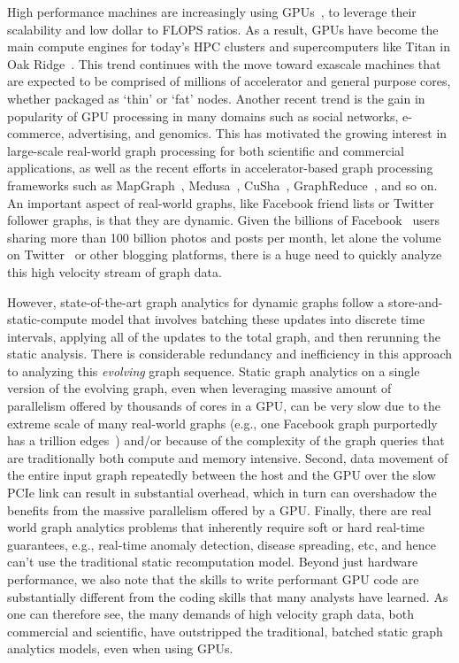 High performance machines are increasingly using GPUs~\cite{15, 16, 17, 18, 19}, to leverage their scalability and low dollar to FLOPS ratios.  As a result, GPUs have become the main compute engines for today’s HPC clusters and supercomputers like Titan in Oak Ridge~\cite{titan}. This trend continues with the move toward exascale machines that are expected to be comprised of millions of accelerator and general purpose cores, whether packaged as `thin' or `fat' nodes. Another recent trend is the gain in popularity of GPU processing in many domains such as social networks, e-commerce, advertising, and genomics. This has motivated the growing interest in large-scale real-world graph processing for both scientific and commercial applications, as well as the recent efforts in accelerator-based graph processing frameworks such as MapGraph~\cite{mapgraph}, Medusa~\cite{medusa}, CuSha~\cite{cusha}, GraphReduce~\cite{GraphReduce}, and so on. An important aspect of real-world graphs, like Facebook friend lists or Twitter follower graphs, is that they are dynamic.  Given the billions of Facebook~\cite{linkbench} users sharing more than 100 billion photos and posts per month, let alone the volume on Twitter~\cite{twitter} or other blogging platforms, there is a huge need to quickly analyze this high velocity stream of graph data. 

However, state-of-the-art graph analytics for dynamic graphs follow a store-and-static-compute model that involves batching these updates into discrete time intervals, applying all of the updates to the total graph, and then rerunning the static analysis.  There is considerable redundancy and inefficiency in this approach to analyzing this \textit{evolving} graph sequence.  Static graph analytics on a single version of the evolving graph, even when leveraging massive amount of parallelism offered by thousands of cores in a GPU, can be very slow due to the extreme scale of many real-world graphs (e.g., one Facebook graph purportedly has a trillion edges~\cite{fb}) and/or because of the complexity of the graph queries that are traditionally both compute and memory intensive. Second, data movement of the entire input graph repeatedly between the host and the GPU over the slow PCIe link can result in substantial overhead, which in turn can overshadow the benefits from the massive parallelism offered by a GPU.  Finally, there are real world graph analytics problems that inherently require soft or hard real-time guarantees, e.g., real-time anomaly detection, disease spreading, etc, and hence can't use the traditional static recomputation model. Beyond just hardware performance, we also note that the skills to write performant GPU code are substantially different from the coding skills that many analysts have learned.  As one can therefore see, the many demands of high velocity graph data, both commercial and scientific, have outstripped the traditional, batched static graph analytics models, even when using GPUs.

